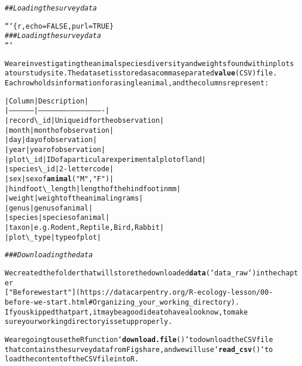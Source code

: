 \documentclass{article}\usepackage[]{graphicx}\usepackage[]{xcolor}
\makeatletter
\newcommand{\hlstr}[1]{\textcolor[rgb]{0.192,0.494,0.8}{#1}}%
\newcommand{\hlcom}[1]{\textcolor[rgb]{0.678,0.584,0.686}{\textit{#1}}}%
\newcommand{\hlkwd}[1]{\textcolor[rgb]{0.737,0.353,0.396}{\textbf{#1}}}%
\newenvironment{kframe}{%
 \def\at@end@of@kframe{}%
 \ifinner\ifhmode%
  \def\at@end@of@kframe{\end{minipage}}%
  \begin{minipage}{\columnwidth}%
 \fi\fi%
 \def\FrameCommand##1{\hskip\@totalleftmargin \hskip-\fboxsep
 \colorbox{shadecolor}{##1}\hskip-\fboxsep
     \hskip-\linewidth \hskip-\@totalleftmargin \hskip\columnwidth}%
 \MakeFramed {\advance\hsize-\width
   \@totalleftmargin\z@ \linewidth\hsize
   \@setminipage}}%
 {\par\unskip\endMakeFramed%
 \at@end@of@kframe}
\newenvironment{knitrout}{}{} %
\makeatother
\begin{document}
\begin{knitrout}
\color{fgcolor}\begin{kframe}
\begin{alltt}

\hlcom{## Loading the survey data}

```\{r, echo=FALSE, purl=TRUE\}
\hlcom{### Loading the survey data}
```

We are investigating the animal species diversity and weights found within plots 
at our study site. The dataset is stored as a comma separated \hlkwd{value} (CSV) file.
Each row holds information for a single animal, and the columns represent:

| Column           | Description                                  |
|------------------|----------------------------------------------|
| record\textbackslash{}_id       | Unique id for the observation                |
| month            | month of observation                         |
| day              | day of observation                           |
| year             | year of observation                          |
| plot\textbackslash{}_id         | ID of a particular experimental plot of land |
| species\textbackslash{}_id      | 2-letter code                                |
| sex              | sex of \hlkwd{animal} (\hlstr{"M"}, \hlstr{"F"})                     |
| hindfoot\textbackslash{}_length | length of the hindfoot in mm                 |
| weight           | weight of the animal in grams                |
| genus            | genus of animal                              |
| species          | species of animal                            |
| taxon            | e.g. Rodent, Reptile, Bird, Rabbit           |
| plot\textbackslash{}_type       | type of plot                                 |

\hlcom{### Downloading the data}

We created the folder that will store the downloaded \hlkwd{data} (`data_raw`) in the chapter
[\hlstr{"Before we start"}](https://datacarpentry.org/R-ecology-lesson/00-before-we-start.html#Organizing_your_working_directory).
If you skipped that part, it may be a good idea to have a look now, to make
sure your working directory is set up properly.

We are going to use the R function `\hlkwd{download.file}()` to download the CSV file
that contains the survey data from Figshare, and we will use `\hlkwd{read_csv}()` to
load the content of the CSV file into R.


\end{alltt}
\end{kframe}
\end{knitrout}
\end{document}
